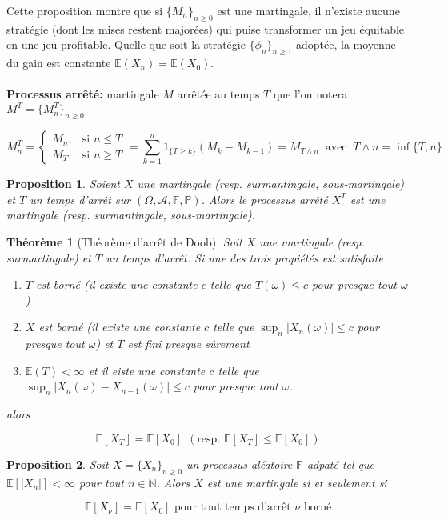 \documentclass[10pt,a4paper,oneside]{article}
\newtheorem{theoreme}{Théorème}
\newtheorem{proposition}{Proposition}
\begin{document}
Cette proposition montre que si $\{ M_n \}_{n \geq 0}$ est une martingale, il n'existe aucune stratégie (dont les mises restent majorées) qui puise transformer un jeu équitable en une jeu profitable. Quelle que soit la stratégie $\{ \phi_n \}_{n \geq 1}$ adoptée, la moyenne du gain est constante $\mathbb{E}(X_n) = \mathbb{E}(X_0)$.
\\ \\
\textbf{Processus arrêté:} martingale $M$ arrêtée au temps $T$ que l'on notera $M^T = \{ M_n^T \}_{n \geq 0}$

\[ M_n^T = \begin{cases}
M_n, &\text{si } n \leq T \\
M_T, &\text{si } n \geq T
\end{cases}
= \sum_{k = 1}^n 1_{\{ T \geq k \}}(M_k - M_{k - 1}) = M_{T \wedge n}\ \text{ avec }\ T \wedge n = \inf\{T,n\}
\]

\begin{proposition}
Soient $X$ une martingale (resp. surmantingale, sous-martingale) et $T$ un temps d'arrêt sur $(\Omega, \mathcal{A}, \mathbb{F}, \mathbb{P})$. Alors le processus arrêté $X^T$ est une martingale (resp. surmantingale, sous-martingale).
\end{proposition}

\begin{theoreme}[Théorème d'arrêt de Doob]
Soit $X$ une martingale (resp. surmartingale) et $T$ un temps d'arrêt. Si une des trois propiétés est satisfaite

\begin{enumerate}
\item
$T$ est borné (il existe une constante $c$ telle que $T(\omega) \leq c$ pour presque tout $\omega$)

\item
$X$ est borné (il existe une constante $c$ telle que $\sup_n |X_n(\omega)| \leq c$ pour presque tout $\omega$) et $T$ est fini presque sûrement

\item
$\mathbb{E}(T) < \infty$ et il eiste une constante $c$ telle que $\sup_n |X_n(\omega) - X_{n - 1}(\omega)| \leq c$ pour presque tout $\omega$.
\end{enumerate}

alors

\[ \mathbb{E}[X_T] = \mathbb{E}[X_0]\ \ (\text{resp. } \mathbb{E}[X_T] \leq \mathbb{E}[X_0]) \]
\end{theoreme}

\begin{proposition}
Soit $X = \{ X_n \}_{n \geq 0}$ un processus aléatoire $\mathbb{F}$-adpaté tel que $\mathbb{E}[|X_n|] < \infty$ pour tout $n \in \mathbb{N}$. Alors $X$ est une martingale si et seulement si

\[ \mathbb{E}[X_\nu] = \mathbb{E}[X_0] \text{ pour tout temps d'arrêt } \nu \text{ borné} \]
\end{proposition}
\end{document}
